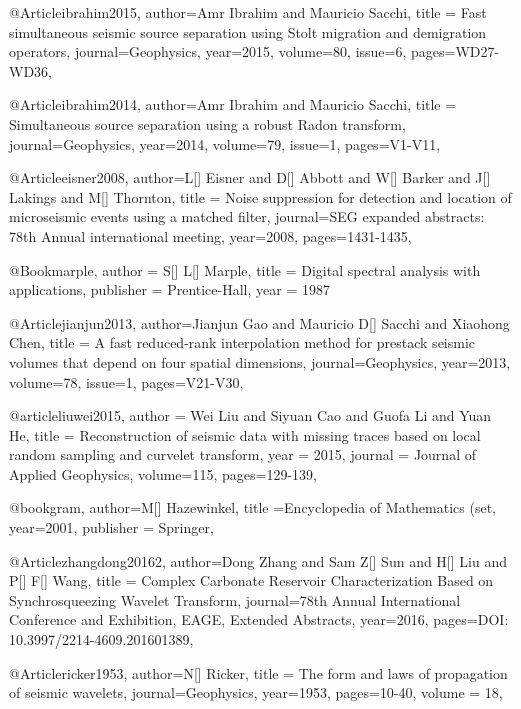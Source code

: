 {@Article{ibrahim2015,
  author={Amr Ibrahim and Mauricio Sacchi},
  title = {Fast simultaneous seismic source separation using Stolt migration and demigration operators},
  journal={Geophysics},
  year=2015,
  volume=80,
  issue=6,
  pages={WD27-WD36},
}

@Article{ibrahim2014,
  author={Amr Ibrahim and Mauricio Sacchi},
  title = {Simultaneous source separation using a robust Radon transform},
  journal={Geophysics},
  year=2014,
  volume=79,
  issue=1,
  pages={V1-V11},
}


@Article{eisner2008,
  author={L[] Eisner and D[] Abbott and W[] Barker and J[] Lakings and M[] Thornton},
  title = {Noise suppression for detection and location of microseismic events using a matched filter},
  journal={SEG expanded abstracts: 78th Annual international meeting},
  year=2008,
  pages={1431-1435},
}

@Book{marple,
  author = 	 {S[] L[] Marple},
  title = 	 {Digital spectral analysis with applications},
  publisher = 	 {Prentice-Hall},
  year = 	 1987}
  
@Article{jianjun2013,
  author={Jianjun Gao and Mauricio D[] Sacchi and Xiaohong Chen},
  title = {A fast reduced-rank interpolation method for prestack seismic volumes that depend on four spatial dimensions},
  journal={Geophysics},
  year=2013,
  volume=78,
    issue=1,
  pages={V21-V30},
}

@article{liuwei2015,
  author =	 {Wei Liu and Siyuan Cao and Guofa Li and Yuan He},
  title =	 {Reconstruction of seismic data with missing traces based on local random sampling and curvelet transform},
  year =	 2015,
  journal =	 {Journal of Applied Geophysics},
  volume={115},
 pages=129-139,
}

@book{gram,
  author={M[] Hazewinkel},
  title ={Encyclopedia of Mathematics (set},
  year=2001,
  publisher = {Springer},
}


@Article{zhangdong20162,
  author={Dong Zhang and Sam Z[] Sun and H[] Liu and P[] F[] Wang},
  title = {Complex Carbonate Reservoir Characterization Based on Synchrosqueezing Wavelet Transform},
  journal={78th Annual International Conference and Exhibition, EAGE, Extended Abstracts},
  year=2016,
  pages={DOI: 10.3997/2214-4609.201601389},
}






@Article{ricker1953,
  author={N[] Ricker},
  title = {The form and laws of propagation of seismic wavelets},
  journal={Geophysics},
  year=1953,
  pages={10-40},
  volume = 18,
}

}
